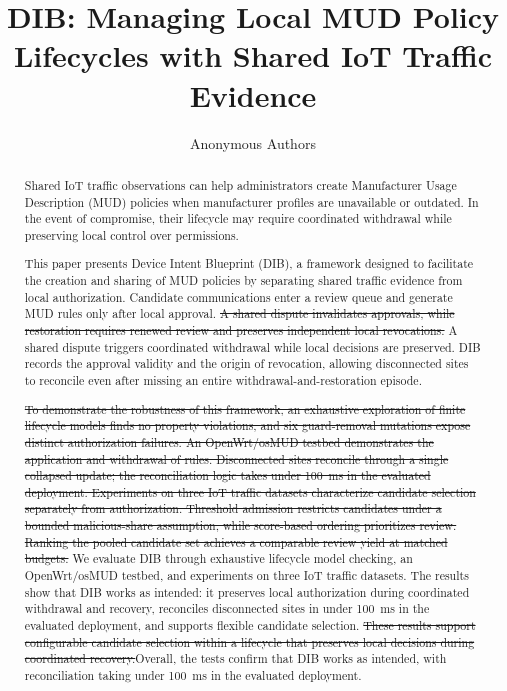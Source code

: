 \documentclass[journal]{IEEEtran}
\theoremstyle{definition}
\newcommand{\del}[1]{{\color{blue}\sout{#1}}}  %
\newcommand{\add}[1]{{\color{red}#1}}          %
\begin{document}
\title{DIB: Managing Local MUD Policy Lifecycles with Shared IoT Traffic Evidence}
\author{Anonymous Authors}
\maketitle

\begin{abstract}
Shared IoT traffic observations can help administrators create Manufacturer Usage Description (MUD) policies when manufacturer profiles are unavailable or outdated.
In the event of compromise, their lifecycle may require coordinated withdrawal while preserving local control over permissions.

This paper presents Device Intent Blueprint (DIB), a framework designed to facilitate the creation and sharing of MUD policies by separating shared traffic evidence from local authorization. Candidate communications enter a review queue and generate MUD rules only after local approval. \del{A shared dispute invalidates approvals, while restoration requires renewed review and preserves independent local revocations.} \add{A shared dispute triggers coordinated withdrawal while local decisions are preserved.} DIB records the approval validity and the origin of revocation, allowing disconnected sites to reconcile even after missing an entire withdrawal-and-restoration episode.

\del{To demonstrate the robustness of this framework, an exhaustive exploration of finite lifecycle models finds no property violations, and six guard-removal mutations expose distinct authorization failures. An OpenWrt/osMUD testbed demonstrates the application and withdrawal of rules. Disconnected sites reconcile through a single collapsed update; the reconciliation logic takes under 100~ms in the evaluated deployment. Experiments on three IoT traffic datasets characterize candidate selection separately from authorization. Threshold admission restricts candidates under a bounded malicious-share assumption, while score-based ordering prioritizes review. Ranking the pooled candidate set achieves a comparable review yield at matched budgets.} \add{We evaluate DIB through exhaustive lifecycle model checking, an OpenWrt/osMUD testbed, and experiments on three IoT traffic datasets. The results show that DIB works as intended: it preserves local authorization during coordinated withdrawal and recovery, reconciles disconnected sites in under 100~ms in the evaluated deployment, and supports flexible candidate selection.} \del{These results support configurable candidate selection within a lifecycle that preserves local decisions during coordinated recovery.}\add{Overall, the tests confirm that DIB works as intended, with reconciliation taking under 100~ms in the evaluated deployment.}
\end{abstract}
\end{document}
